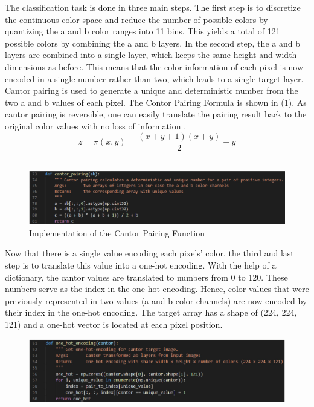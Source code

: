 \documentclass[12pt,letterpaper]{article}
\begin{document}
The classification task is done in three main steps. The first step is to discretize the continuous color space and reduce the number of possible colors by quantizing the a and b color ranges into 11 bins. This yields a total of 121 possible colors by combining the a and b layers. In the second step, the a and b layers are combined into a single layer, which keeps the same height and width dimensions as before. This means that the color information of each pixel is now encoded in a single number rather than two, which leads to a single target layer. Cantor pairing is used to generate a unique and deterministic number from the two a and b values of each pixel. The Contor Pairing Formula is shown in (1). As cantor pairing is reversible, one can easily translate the pairing result back to the original color values with no loss of information \citep{cantor2007}.\\
\begin{equation}
z = \pi(x,y) = \frac{(x+y+1)(x+y)}{2}+y
\end{equation}
\\
\begin{figure}[htb]
	\centering
	\includegraphics[width=1.0\textwidth]{code_cantor_pairing.png}
	\caption{Implementation of the Cantor Pairing Function}
	\label{cantorpairing}
\end{figure}
Now that there is a single value encoding each pixels’ color, the third and last step is to translate this value into a one-hot encoding. With the help of a dictionary, the cantor values are translated to numbers from 0 to 120. These numbers serve as the index in the one-hot encoding. Hence, color values that were previously represented in two values (a and b color channels) are now encoded by their index in the one-hot encoding. The target array has a shape of (224, 224, 121) and a one-hot vector is located at each pixel position.
\begin{figure}[htb]
	\centering
	\includegraphics[width=1.0\textwidth]{code_onehot.png}
	\caption{}
	\label{onehot}
\end{figure}
\end{document}
